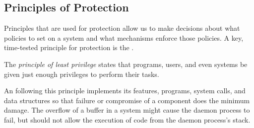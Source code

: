 \subsection{Principles of Protection}\label{subsec:Protection_Principles}
Principles that are used for protection allow us to make decisions about what policies to set on a system and what mechanisms enforce those policies.
A key, time-tested principle for protection is the .

\begin{definition}\label{def:Principle_Least_Privilege}
  The \emph{principle of least privilege} states that programs, users, and even systems be given just enough privileges to perform their tasks.
\end{definition}

An  following this principle implements its features, programs, system calls, and data structures so that failure or compromise of a component does the minimum damage.
The overflow of a buffer in a system  might cause the daemon process to fail, but should not allow the execution of code from the daemon process’s stack.


